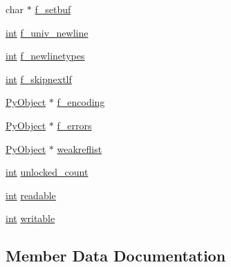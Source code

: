 \begin{DoxyCompactItemize}
\item 
char $\ast$ \mbox{\hyperlink{struct_py_file_object_aa7afc9ae141b8d4c54a21a890d2fb7a2}{f\+\_\+setbuf}}
\item 
\mbox{\hyperlink{warnings_8h_a74f207b5aa4ba51c3a2ad59b219a423b}{int}} \mbox{\hyperlink{struct_py_file_object_a345909377edee5703d7b95c4691eff54}{f\+\_\+univ\+\_\+newline}}
\item 
\mbox{\hyperlink{warnings_8h_a74f207b5aa4ba51c3a2ad59b219a423b}{int}} \mbox{\hyperlink{struct_py_file_object_ae2035875d2258619eb11f574b7c8c566}{f\+\_\+newlinetypes}}
\item 
\mbox{\hyperlink{warnings_8h_a74f207b5aa4ba51c3a2ad59b219a423b}{int}} \mbox{\hyperlink{struct_py_file_object_a441418dae94c5b006fa8ce1d93d29718}{f\+\_\+skipnextlf}}
\item 
\mbox{\hyperlink{_python27_2object_8h_aadc84ac7aed2cfa6f20c25f62bf3dac7}{Py\+Object}} $\ast$ \mbox{\hyperlink{struct_py_file_object_a3a55985a0d83e121bb284e0ea68adb45}{f\+\_\+encoding}}
\item 
\mbox{\hyperlink{_python27_2object_8h_aadc84ac7aed2cfa6f20c25f62bf3dac7}{Py\+Object}} $\ast$ \mbox{\hyperlink{struct_py_file_object_a55403b6e96258499d8ca3060a9eedc56}{f\+\_\+errors}}
\item 
\mbox{\hyperlink{_python27_2object_8h_aadc84ac7aed2cfa6f20c25f62bf3dac7}{Py\+Object}} $\ast$ \mbox{\hyperlink{struct_py_file_object_a4f1c758772df6d823bb29fcad8816590}{weakreflist}}
\item 
\mbox{\hyperlink{warnings_8h_a74f207b5aa4ba51c3a2ad59b219a423b}{int}} \mbox{\hyperlink{struct_py_file_object_aaf9159048694b3756653630194aca045}{unlocked\+\_\+count}}
\item 
\mbox{\hyperlink{warnings_8h_a74f207b5aa4ba51c3a2ad59b219a423b}{int}} \mbox{\hyperlink{struct_py_file_object_ad399dcd51687bf7ed6870078ec0dfd56}{readable}}
\item 
\mbox{\hyperlink{warnings_8h_a74f207b5aa4ba51c3a2ad59b219a423b}{int}} \mbox{\hyperlink{struct_py_file_object_aa2c3f3875dd70e147e6382f63a97a00b}{writable}}
\end{DoxyCompactItemize}


\subsection{Member Data Documentation}
\mbox{\label{struct_py_file_object_a52749e0f0897fc4b6deb55cebc977e9b}} 
